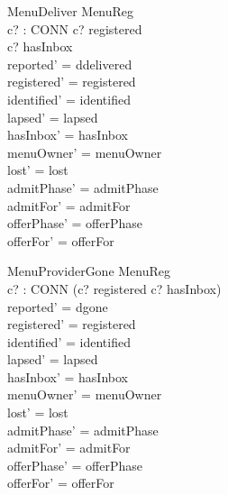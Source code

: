 \documentclass[a4paper,10pt,fleqn]{article}
\begin{document}
\begin{schema}{MenuDeliver}
  \Delta MenuReg \\
  c? : CONN
\where
  c? \in registered \\
  c? \in hasInbox \\
  reported' = ddelivered \\
  registered' = registered \\
  identified' = identified \\
  lapsed' = lapsed \\
  hasInbox' = hasInbox \\
  menuOwner' = menuOwner \\
  lost' = lost \\
  admitPhase' = admitPhase \\
  admitFor' = admitFor \\
  offerPhase' = offerPhase \\
  offerFor' = offerFor
\end{schema}

\begin{schema}{MenuProviderGone}
  \Delta MenuReg \\
  c? : CONN
\where
  \lnot (c? \in registered \land c? \in hasInbox) \\
  reported' = dgone \\
  registered' = registered \\
  identified' = identified \\
  lapsed' = lapsed \\
  hasInbox' = hasInbox \\
  menuOwner' = menuOwner \\
  lost' = lost \\
  admitPhase' = admitPhase \\
  admitFor' = admitFor \\
  offerPhase' = offerPhase \\
  offerFor' = offerFor
\end{schema}
\end{document}
